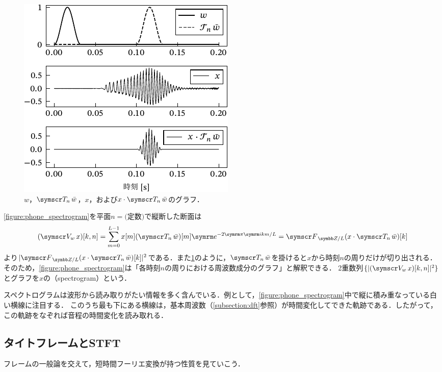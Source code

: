 \documentclass[../../main]{subfiles}
\begin{document}
\begin{figure}[htbp]
  \centering
  \includegraphics{figures/windowing.pdf}
  \caption{\(w\)，\(\translate{n}\conj{w}\)，\(x\)，および\(x\cdot\translate{n}\conj{w}\)のグラフ．}
  \label{figure:windowing}
\end{figure}

\cref{figure:phone_spectrogram}を平面\(n=\text{(定数)}\)で縦断した断面は
\[
  (\stft{w}x)[k,n] = \sum_{m=0}^{L-1}x[m](\translate{n}\conj{w})[m]\napr^{-2\krez\iuni km/L}
  = \dft{L}(x\cdot\translate{n}\conj{w})[k]
\]
より\(\abs{\dft{L}(x\cdot\translate{n}\conj{w})[k]}^2\)である．また\cref{figure:windowing}のように，\(\translate{n}\conj{w}\)を掛けると\(x\)から時刻\(n\)の周りだけが切り出される．
そのため，\cref{figure:phone_spectrogram}は「各時刻\(n\)の周りにおける周波数成分のグラフ」と解釈できる．
2重数列\(\seq{\abs{(\stft{w}x)[k,n]}^2}\)とグラフを\(x\)の（spectrogram）という．

スペクトログラムは波形から読み取りがたい情報を多く含んでいる．例として，\cref{figure:phone_spectrogram}中で縦に積み重なっている白い横線に注目する．
このうち最も下にある横線は，基本周波数（\cref{subsection:dft}参照）が時間変化してできた軌跡である．したがって，この軌跡をなぞれば音程の時間変化を読み取れる．

\subsection{タイトフレームとSTFT}

フレームの一般論を交えて，短時間フーリエ変換が持つ性質を見ていこう．
\end{document}

